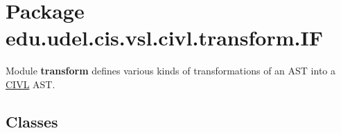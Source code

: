 \hypertarget{namespaceedu_1_1udel_1_1cis_1_1vsl_1_1civl_1_1transform_1_1IF}{}\section{Package edu.\+udel.\+cis.\+vsl.\+civl.\+transform.\+I\+F}
\label{namespaceedu_1_1udel_1_1cis_1_1vsl_1_1civl_1_1transform_1_1IF}


Module {\bfseries transform } defines various kinds of transformations of an A\+S\+T into a \hyperlink{classedu_1_1udel_1_1cis_1_1vsl_1_1civl_1_1CIVL}{C\+I\+V\+L} A\+S\+T.  


\subsection*{Classes}
